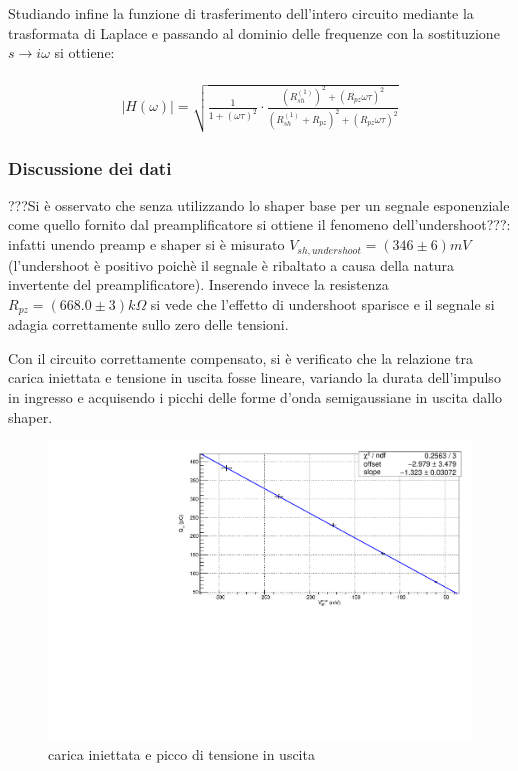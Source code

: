 \documentclass{article}
\begin{document}
Studiando infine la funzione di trasferimento dell'intero circuito  mediante la trasformata di Laplace e passando al dominio delle frequenze con la sostituzione $s\xrightarrow[]{} i\omega$ si ottiene:

\begin{multline}
    \label{eqn:shapercomp_trasf}
    |H(\omega)| =\sqrt{\frac{1}{1+(\omega\tau)^2}\cdot \frac{(R_{sh}^{(1)})^2+(R_{pz}\omega\tau)^2 }{(R_{sh}^{(1)}+R_{pz})^2+(R_{pz}\omega\tau)^2}}
\end{multline}

\subsubsection{Discussione dei dati}

???Si è osservato che senza utilizzando lo shaper base per un segnale esponenziale come quello fornito dal preamplificatore si ottiene il 
fenomeno dell'undershoot???: infatti unendo preamp e shaper si è misurato $V_{sh, undershoot}=(346 \pm 6)mV$ (l'undershoot è positivo poichè
il segnale è ribaltato a causa della natura invertente del preamplificatore). Inserendo invece la resistenza 
$R_{pz} = (668.0 \pm 3) k\Omega$ si vede che l'effetto di undershoot sparisce e il segnale si adagia correttamente sullo zero 
delle tensioni.

Con il circuito correttamente compensato, si è verificato che la relazione tra carica iniettata e tensione in uscita fosse
lineare, variando la durata dell'impulso in ingresso e acquisendo i picchi delle forme d'onda semigaussiane in uscita dallo shaper.

\begin{center}
    \begin{figure}[H]
    \centering
    \includegraphics[scale=0.375, angle=0]{fitshaper.pdf}
    \caption{carica iniettata e picco di tensione in uscita}
    \label{fig:fitshaper}
    \end{figure}
\end{center}
\end{document}
